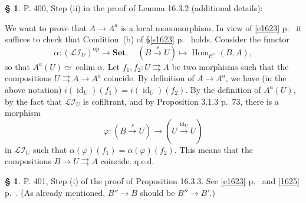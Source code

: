 \documentclass[12pt]{article}
\theoremstyle{remark}
\theoremstyle{definition}
\newtheorem{s}[thm]{\S}
\newcommand{\cc}{\mathcal}
\newcommand{\C}{\mathcal C}
\newcommand{\Set}{\mathbf{Set}}
\newcommand{\parar}{\rightrightarrows}
\newcommand{\xr}{\xrightarrow}
\DeclareMathOperator*{\co}{colim}
\DeclareMathOperator{\id}{id}
\DeclareMathOperator{\Hom}{Hom}%
\DeclareMathOperator{\op}{op}
\begin{document}
\begin{s} 
P. 400, Step (ii) in the proof of Lemma 16.3.2 (additional details):

We want to prove that $A\to A^a$ is a local monomorphism. In view of \eqref{e1623} p.~\pageref{e1623} it suffices to check that Condition~(b) of \S\ref{s1623} p.~\pageref{s1623} holds. Consider the functor 
$$
\alpha:(\cc{LI}_U)^{\op}\to\Set,\quad(B\xr sU)\mapsto\Hom_{\C^\wedge}(B,A),
$$ 
so that $A^a(U)\simeq\co\alpha$. Let $f_1,f_2:U\parar A$ be two morphisms such that the compositions $U\parar A\to A^a$ coincide. By definition of $A\to A^a$, we have (in the above notation) $i(\id_U)(f_1)=i(\id_U)(f_2)$. By the definition of $A^a(U)$, by the fact that $\cc{LI}_U$ is cofiltrant, and by Proposition 3.1.3 p.~73, there is a morphism 
$$
\varphi:(B\xr sU)\to(U\xr{\id_U}U)
$$ 
in $\cc{LI}_U$ such that $\alpha(\varphi)(f_1)=\alpha(\varphi)(f_2)$. This means that the compositions $B\to U\parar A$ coincide. q.e.d.
\end{s}
%
%
\begin{s} P. 401, Step (i) of the proof of Proposition 16.3.3. See \eqref{e1623} p.~\pageref{e1623} and \eqref{1625} p.~\pageref{1625}. (As already mentioned, $B''\to B$ should be $B''\to B'$.)
\end{s}
%
%
\end{document}
